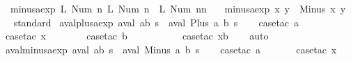 \begin{isabellebody}
\ \ {\isachardoublequoteopen}minus{\isacharunderscore}aexp\ {\isacharparenleft}L\ {\isacharparenleft}Num\ n{}{\isacharparenright}{\isacharparenright}\ {\isacharparenleft}L\ {\isacharparenleft}Num\ n{}{\isacharparenright}{\isacharparenright}\ {\isacharequal}\ L\ {\isacharparenleft}Num\ {\isacharparenleft}n{}{\isacharminus}n{}{\isacharparenright}{\isacharparenright}{\isachardoublequoteclose}\ {\isacharbar}\isanewline
\ \ {\isachardoublequoteopen}minus{\isacharunderscore}aexp\ x\ y\ {\isacharequal}\ Minus\ x\ y{\isachardoublequoteclose}\isanewline
\isanewline
{}\isamarkupfalse%
%
\isadelimproof
\ %
\endisadelimproof
%
\isatagproof
{}\isamarkupfalse%
\ standard%
\endisatagproof
{\isafoldproof}%
%
\isadelimproof
%
\endisadelimproof
\isanewline
{}\isamarkupfalse%
\isanewline
\isanewline
{}\isamarkupfalse%
\ aval{\isacharunderscore}plus{\isacharunderscore}aexp{\isacharcolon}\ {\isachardoublequoteopen}aval\ {\isacharparenleft}a{\isacharplus}b{\isacharparenright}\ s\ {\isacharequal}\ aval\ {\isacharparenleft}Plus\ a\ b{\isacharparenright}\ s{\isachardoublequoteclose}\isanewline
%
\isadelimproof
\ \ %
\endisadelimproof
%
\isatagproof
{}\isamarkupfalse%
\ {\isacharparenleft}case{\isacharunderscore}tac\ a{\isacharparenright}\isanewline
\ \ \ \ \ \isamarkupfalse%
\ {\isacharparenleft}case{\isacharunderscore}tac\ x{}{\isacharparenright}\isanewline
\ \ \ \ \ \ \isamarkupfalse%
\ {\isacharparenleft}case{\isacharunderscore}tac\ b{\isacharparenright}\isanewline
\ \ \ \ \ \ \ \ \ \isamarkupfalse%
\ {\isacharparenleft}case{\isacharunderscore}tac\ x{}b{\isacharparenright}\isanewline
\ \ \isamarkupfalse%
\ auto%
\endisatagproof
{\isafoldproof}%
%
\isadelimproof
\isanewline
%
\endisadelimproof
\isanewline
{}\isamarkupfalse%
\ aval{\isacharunderscore}minus{\isacharunderscore}aexp{\isacharcolon}\ {\isachardoublequoteopen}aval\ {\isacharparenleft}a{\isacharminus}b{\isacharparenright}\ s\ {\isacharequal}\ aval\ {\isacharparenleft}Minus\ a\ b{\isacharparenright}\ s{\isachardoublequoteclose}\isanewline
%
\isadelimproof
\ \ %
\endisadelimproof
%
\isatagproof
{}\isamarkupfalse%
\ {\isacharparenleft}case{\isacharunderscore}tac\ a{\isacharparenright}\isanewline
\ \ \ \ \ \isamarkupfalse%
\ {\isacharparenleft}case{\isacharunderscore}tac\ x{}{\isacharparenright}\isanewline
\ \ \ \ \ \ \isamarkupfalse%

\end{isabellebody}
